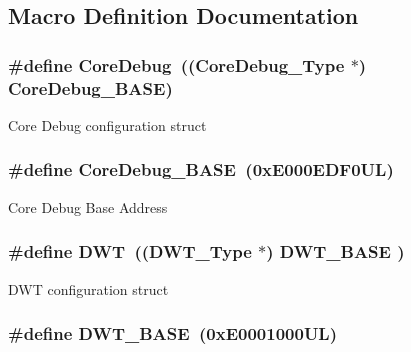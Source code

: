 \subsection{Macro Definition Documentation}
\hypertarget{group__CMSIS__core__base_gab6e30a2b802d9021619dbb0be7f5d63d}{
\subsubsection[{Core\-Debug}]{\setlength{\rightskip}{0pt plus 5cm}\#define Core\-Debug~(({\bf Core\-Debug\-\_\-\-Type} $\ast$)     {\bf Core\-Debug\-\_\-\-B\-A\-S\-E})}}\label{group__CMSIS__core__base_gab6e30a2b802d9021619dbb0be7f5d63d}
Core Debug configuration struct \hypertarget{group__CMSIS__core__base_ga680604dbcda9e9b31a1639fcffe5230b}{
\subsubsection[{Core\-Debug\-\_\-\-B\-A\-S\-E}]{\setlength{\rightskip}{0pt plus 5cm}\#define Core\-Debug\-\_\-\-B\-A\-S\-E~(0x\-E000\-E\-D\-F0\-U\-L)}}\label{group__CMSIS__core__base_ga680604dbcda9e9b31a1639fcffe5230b}
Core Debug Base Address \hypertarget{group__CMSIS__core__base_gabbe5a060185e1d5afa3f85b14e10a6ce}{
\subsubsection[{D\-W\-T}]{\setlength{\rightskip}{0pt plus 5cm}\#define D\-W\-T~(({\bf D\-W\-T\-\_\-\-Type}       $\ast$)     {\bf D\-W\-T\-\_\-\-B\-A\-S\-E}      )}}\label{group__CMSIS__core__base_gabbe5a060185e1d5afa3f85b14e10a6ce}
D\-W\-T configuration struct \hypertarget{group__CMSIS__core__base_gafdab534f961bf8935eb456cb7700dcd2}{
\subsubsection[{D\-W\-T\-\_\-\-B\-A\-S\-E}]{\setlength{\rightskip}{0pt plus 5cm}\#define D\-W\-T\-\_\-\-B\-A\-S\-E~(0x\-E0001000\-U\-L)}}\label{group__CMSIS__core__base_gafdab534f961bf8935eb456cb7700dcd2}
